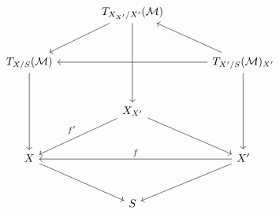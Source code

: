 \[
\begin{tikzcd}[column sep=large,row sep=large]
& T_{X_{X'}/X'}(\mathcal M) \arrow[dl] \arrow[dd] & \\
T_{X/S}(\mathcal M) \arrow[dd] && T_{X'/S}(\mathcal M)_{X'} \arrow[ul] \arrow[ll] \arrow[dd]\\
& X_{X'} \arrow[dl,"f'"'] \arrow[dr] & \\
X \arrow[rr,leftarrow,"f"] \arrow[dr] && X' \arrow[dl]\\
& S &
\end{tikzcd}
\]
